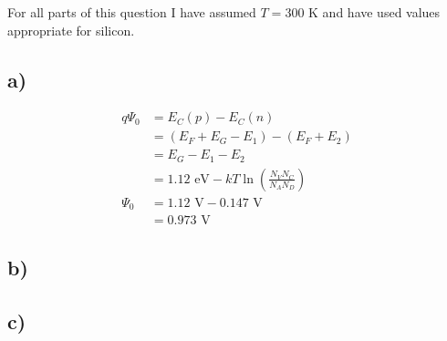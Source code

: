 For all parts of this question I have assumed $T = 300 \textrm{ K}$ and have used values appropriate for silicon.
\subsection*{a)}
	\[
	\begin{aligned}
		q \Psi_0 &= E_C(p) - E_C(n) \\
			   &= (E_F + E_G - E_1) - (E_F + E_2) \\
			   &= E_G - E_1 - E_2 \\
			   &= 1.12 \textrm{ eV} - k T \ln \left( \frac{N_V N_C}{N_A N_D} \right) \\
			\Psi_0  &=	1.12 \textrm{ V} - 0.147 \textrm{ V} \\
			   &= 0.973 \textrm{ V}	   
	\end{aligned}
	\]
\subsection*{b)}
	
\subsection*{c)}
	
